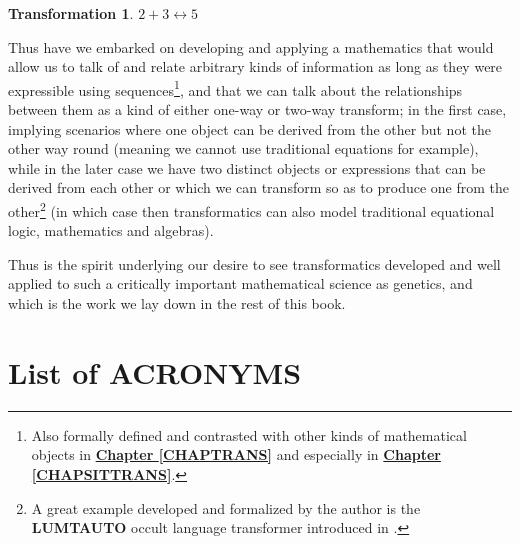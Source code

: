 \documentclass[a4paper, 18pt]{book} %
\newtheorem{trans}{Transformation}
\begin{document}
\vspace{1em}
\begin{trans}
$2 + 3 \leftrightarrow  5 $
\end{trans}
\vspace{1em}



Thus have we embarked on developing and applying a mathematics that would allow us to talk of and relate arbitrary kinds of information as long as they were expressible using sequences\footnote{Also formally defined and contrasted with other kinds of mathematical objects in \textbf{\hyperref[CHAPTRANS]{Chapter \ref{CHAPTRANS}}} and especially in  \textbf{\hyperref[CHAPSITTRANS]{Chapter \ref{CHAPSITTRANS}}}.}, and that we can talk about the relationships between them as a kind of either one-way or two-way transform; in the first case, implying scenarios where one object can be derived from the other but not the other way round (meaning we cannot use traditional equations for example), while in the later case we have two distinct objects or expressions that can be derived from each other or which we can transform so as to produce one from the other\footnote{A great example developed and formalized by the author is the \textbf{LUMTAUTO} occult language transformer introduced in \cite{lutalo_2025_grimlumtauto}.} (in which case then transformatics can also model traditional equational logic, mathematics and algebras). 

\vspace{2em}

Thus is the spirit underlying our desire to see transformatics developed and well applied to such a critically important mathematical science as genetics, and which is the work we lay down in the rest of this book.
 


\chapter*{List of ACRONYMS}
\label{CHAPACRONYMNS}
\end{document}
